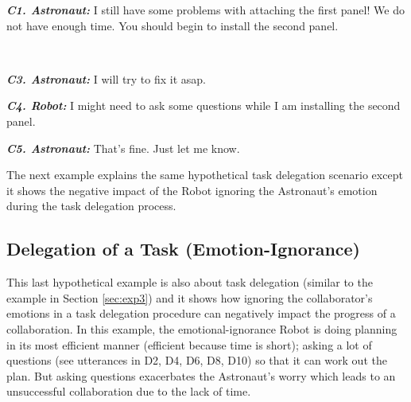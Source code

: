 \begin{description}
  \item \textit{\textbf{C1. Astronaut:}} I still have some problems with
  attaching the first panel! We do not have enough time. You should begin to
  install the second panel.\\

  \item {}\\

  \item \textit{\textbf{C3. Astronaut:}} I will try to fix it asap.\\

  \item \textit{\textbf{C4. Robot:}} I might need to ask some questions while I
  am installing the second panel.\\

  \item \textit{\textbf{C5. Astronaut:}} That's fine. Just let me know.
  
\end{description}

The next example explains the same hypothetical task delegation scenario except
it shows the negative impact of the Robot ignoring the Astronaut's emotion
during the task delegation process.

\subsection{Delegation of a Task (Emotion-Ignorance)}
\label{sec:exp4}

This last hypothetical example is also about task delegation (similar to the
example in Section \ref{sec:exp3}) and it shows how ignoring the collaborator's
emotions in a task delegation procedure can negatively impact the progress of a
collaboration. In this example, the emotional-ignorance Robot is doing planning
in its most efficient manner (efficient because time is short); asking a lot of
questions (see utterances in D2, D4, D6, D8, D10) so that it can work out the
plan. But asking questions exacerbates the Astronaut's worry which leads to an
unsuccessful collaboration due to the lack of time. 

